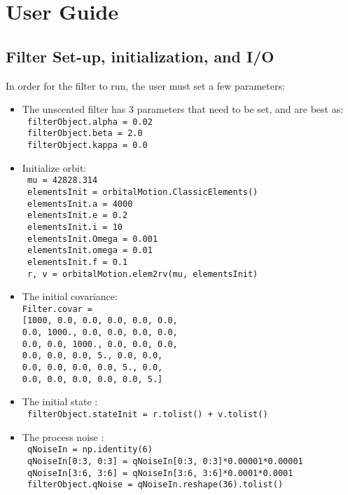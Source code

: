 
\section{User Guide}
\subsection{Filter Set-up, initialization, and I/O}

In order for the filter to run, the user must set a few parameters:

\begin{itemize}
\item The unscented filter has 3 parameters that need to be set, and are best as: \\
      \texttt{ filterObject.alpha = 0.02} \\
      \texttt{ filterObject.beta = 2.0} \\
      \texttt{ filterObject.kappa = 0.0} 
\item Initialize orbit: \\ 
\texttt{     mu = 42828.314} \\
 \texttt{    elementsInit = orbitalMotion.ClassicElements()} \\
 \texttt{    elementsInit.a = 4000} \\
 \texttt{    elementsInit.e = 0.2} \\
 \texttt{    elementsInit.i = 10} \\
  \texttt{   elementsInit.Omega = 0.001} \\
 \texttt{    elementsInit.omega = 0.01} \\
 \texttt{    elementsInit.f = 0.1} \\
 \texttt{    r, v = orbitalMotion.elem2rv(mu, elementsInit)} 
\item The initial covariance: \\
 \texttt{Filter.covar =} \\
  \texttt{[1000, 0.0, 0.0, 0.0, 0.0, 0.0,\\
                              0.0, 1000., 0.0, 0.0, 0.0, 0.0,\\
                              0.0, 0.0, 1000., 0.0, 0.0, 0.0,\\
                              0.0, 0.0, 0.0, 5., 0.0, 0.0,\\
                              0.0, 0.0, 0.0, 0.0, 5., 0.0,\\
                              0.0, 0.0, 0.0, 0.0, 0.0, 5.]}
 \item The initial state :\\
  \texttt{      filterObject.stateInit = r.tolist() + v.tolist()} 
    \item The process noise :\\
  \texttt{     qNoiseIn = np.identity(6)} \\
  \texttt{     qNoiseIn[0:3, 0:3] = qNoiseIn[0:3, 0:3]*0.00001*0.00001} \\
  \texttt{     qNoiseIn[3:6, 3:6] = qNoiseIn[3:6, 3:6]*0.0001*0.0001} \\
  \texttt{     filterObject.qNoise = qNoiseIn.reshape(36).tolist()}
\end{itemize}

